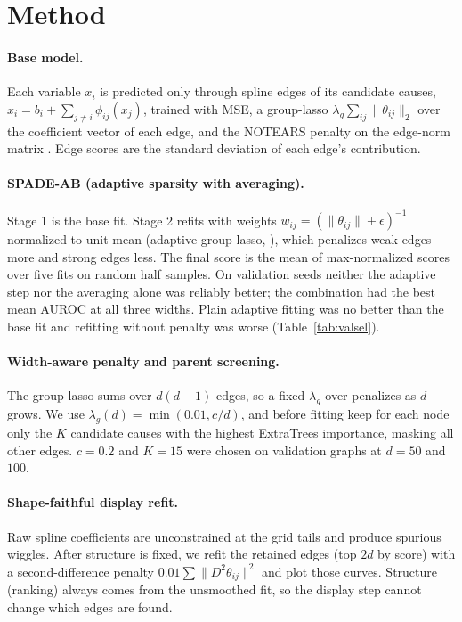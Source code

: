\documentclass[11pt]{article}
\begin{document}
\section{Method}
\paragraph{Base model.} Each variable $x_i$ is predicted only through spline edges of its candidate
causes, $\hat x_i=b_i+\sum_{j\ne i}\phi_{ij}(x_j)$, trained with MSE, a group-lasso
$\lambda_g\sum_{ij}\lVert\theta_{ij}\rVert_2$ over the coefficient vector of each edge, and the NOTEARS
penalty on the edge-norm matrix \citep{Zheng2018}. Edge scores are the standard deviation of each edge's
contribution.

\paragraph{SPADE-AB (adaptive sparsity with averaging).} Stage 1 is the base fit. Stage 2 refits with
weights $w_{ij}=(\lVert\theta_{ij}\rVert+\epsilon)^{-1}$ normalized to unit mean (adaptive group-lasso,
\citealt{Zou2006}), which penalizes weak edges more and strong edges less. The final score is the mean of
max-normalized scores over five fits on random half samples. On validation seeds neither the adaptive step
nor the averaging alone was reliably better; the combination had the best mean AUROC at all three widths.
Plain adaptive fitting was no better than the base fit and refitting without penalty was worse
(Table~\ref{tab:valsel}).

\paragraph{Width-aware penalty and parent screening.} The group-lasso sums over $d(d-1)$ edges, so a fixed
$\lambda_g$ over-penalizes as $d$ grows. We use $\lambda_g(d)=\min(0.01,c/d)$, and before fitting keep for
each node only the $K$ candidate causes with the highest ExtraTrees importance, masking all other edges.
$c=0.2$ and $K=15$ were chosen on validation graphs at $d=50$ and $100$.

\paragraph{Shape-faithful display refit.} Raw spline coefficients are unconstrained at the grid tails and
produce spurious wiggles. After structure is fixed, we refit the retained edges (top $2d$ by score) with a
second-difference penalty $0.01\sum\lVert D^2\theta_{ij}\rVert^2$ and plot those curves. Structure
(ranking) always comes from the unsmoothed fit, so the display step cannot change which edges are found.
\end{document}
